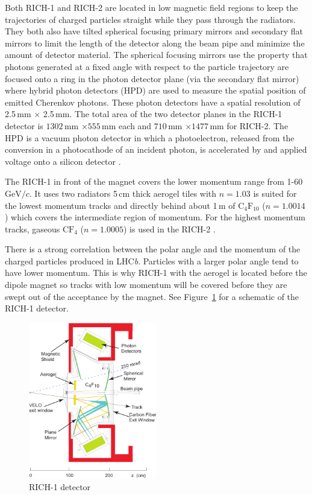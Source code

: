 \documentclass[11pt]{scrreprt}
\begin{document}
Both RICH-1 and RICH-2 are located in low magnetic field regions to keep the trajectories of charged particles straight while they pass through the radiators. They both also have tilted spherical focusing primary mirrors and secondary flat mirrors to limit the length of the detector along the beam pipe and minimize the amount of detector material. The spherical focusing mirrors use the property that photons generated at a fixed angle with respect to the particle trajectory are focused onto a ring in the photon detector plane (via the secondary flat mirror) where hybrid photon detectors (HPD) are used to measure the spatial position of emitted Cherenkov photons. These photon detectors have a spatial resolution of 2.5\,mm $\times$ 2.5\,mm. The total area of the two detector planes in the RICH-1 detector is $1302$\,mm $\times 555$\,mm each and $710$\,mm $\times 1477$\,mm for RICH-2.  The HPD is a vacuum photon detector in which a photoelectron, released from the conversion in a photocathode of an incident photon, is accelerated by and applied voltage onto a silicon detector \cite{AlvesJr2008}. 

The RICH-1 in front of the magnet covers the lower momentum range from 1-60 $\text{GeV}/c$. It uses two radiators 5\,cm thick aerogel tiles with $n=1.03$ is suited for the lowest momentum tracks and directly behind about 1\,m of $\text{C}_4\text{F}_{10}$ ($n=1.0014$) which covers the intermediate region of momentum. For the highest momentum tracks, 
gaseous $\text{C}\text{F}_4$ ($n=1.0005$) is used in the RICH-2 \cite{LHCb2000}.

There is a strong correlation between the polar angle and the momentum of the charged particles produced in LHC\textit{b}. Particles with a larger polar angle tend to have lower momentum. This is why RICH-1 with the aerogel is located before the dipole magnet so tracks with low momentum will be covered before they are swept out of the acceptance by the magnet. See Figure~\ref{fig:rich1} for a schematic of the RICH-1 detector.

\begin{figure}[tb]
  \centering
  \includegraphics[width=0.5\textwidth]{pics/rich1-2d}
  \caption{RICH-1 detector \cite{LHCb:2000}}
  \label{fig:rich1}
\end{figure}
\end{document}
